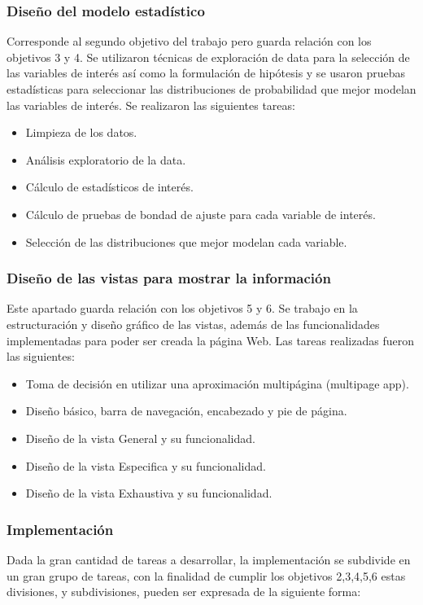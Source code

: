 \subsubsection{Diseño del modelo estadístico}
Corresponde al segundo objetivo del trabajo pero guarda relación con los
objetivos 3 y 4. Se utilizaron técnicas de exploración de data para la
selección de las variables de interés así como la formulación de hipótesis y se
usaron pruebas estadísticas para seleccionar las distribuciones de probabilidad
que mejor modelan las variables de interés. Se realizaron las siguientes
tareas:

\begin{itemize}
    \item Limpieza de los datos.
    \item Análisis exploratorio de la data.
    \item Cálculo de estadísticos de interés.
    \item Cálculo de pruebas de bondad de ajuste para cada variable de interés.
    \item Selección de las distribuciones que mejor modelan cada variable.
\end{itemize}

\subsubsection{Diseño de las vistas para mostrar la información}
Este apartado guarda relación con los objetivos 5 y 6. Se trabajo en la
estructuración y diseño gráfico de las vistas, además de las funcionalidades
implementadas para poder ser creada la página Web. Las tareas realizadas
fueron las siguientes:

\begin{itemize}
    \item Toma de decisión en utilizar una aproximación multipágina (multipage app).
    \item Diseño básico, barra de navegación, encabezado y pie de página.
    \item Diseño de la vista General y su funcionalidad.
    \item Diseño de la vista Especifica y su funcionalidad.
    \item Diseño de la vista Exhaustiva y su funcionalidad.
\end{itemize}

\subsubsection{Implementación}
Dada la gran cantidad de tareas a desarrollar, la implementación se subdivide
en un gran grupo de tareas, con la finalidad de cumplir los objetivos 2,3,4,5,6
estas divisiones, y subdivisiones, pueden ser expresada de la siguiente forma:

